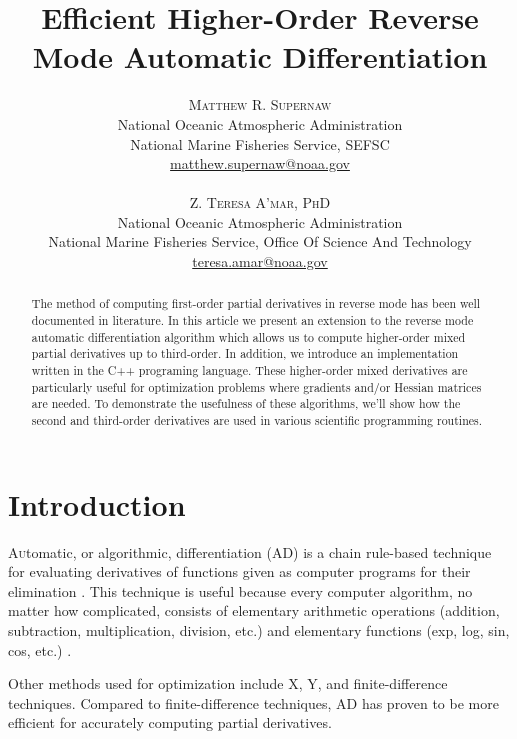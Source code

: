\documentclass[oneside]{article}
\title{\vspace{-15mm}\fontsize{24pt}{10pt}\selectfont\textbf{Efficient Higher-Order Reverse Mode Automatic Differentiation}} %
\author{
\large
\textsc{Matthew R. Supernaw}\\[2mm] %
\normalsize National Oceanic Atmospheric Administration \\ %
\normalsize National Marine Fisheries Service, SEFSC\\ %
\normalsize \href{mailto:matthew.supernaw@noaa.gov}{matthew.supernaw@noaa.gov} \\ %
\\
\textsc{Z. Teresa A'mar, PhD}\\[2mm] %
\normalsize National Oceanic Atmospheric Administration \\ %
\normalsize National Marine Fisheries Service, Office Of Science And Technology\\ %
\normalsize \href{mailto:teresa.amar@noaa.gov}{teresa.amar@noaa.gov} \\%
\vspace{-5mm}
}
\date{}
\begin{document}
\maketitle %

\thispagestyle{fancy} %


\begin{abstract}

\noindent
The method of computing first-order partial derivatives in reverse mode has been well documented in literature. In this article we present an extension to the reverse mode automatic differentiation algorithm which allows us to compute higher-order mixed partial derivatives up to third-order. In addition, we introduce an implementation written in the C++ programing language. These higher-order mixed derivatives are particularly useful for optimization problems where gradients and/or Hessian matrices are needed. To demonstrate the usefulness of these algorithms, we'll show how the second and third-order derivatives are used in various scientific programming routines.


\end{abstract}



\section{Introduction}


\lettrine[nindent=0em,lines=3]{A}utomatic, or algorithmic, differentiation (AD) is a chain rule-based technique for evaluating derivatives of functions given as computer programs for their elimination \cite{griewank}. This technique is useful because every computer algorithm, no matter how complicated, consists of elementary arithmetic operations (addition, subtraction, multiplication, division, etc.) and elementary functions (exp, log, sin, cos, etc.) \cite{wiki_ad}.

Other methods used for optimization include X, Y, and finite-difference techniques.  Compared to finite-difference techniques, AD has proven to be more efficient for accurately computing partial derivatives. \\
\end{document}
